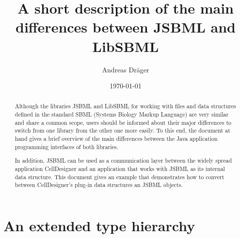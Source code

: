 \documentclass[
  letterpaper,
  11pt,
  headsepline,
  pointlessnumbers,
  tablecaptionabove,
  headinclude,
  appendixprefix,
  idxtotoc,
  bibtotoc,
  titlepage
]{scrartcl}
\title{A short description of the main differences between JSBML and LibSBML}
\author{Andreas Dr\"ager}
\date{\today}
\begin{document}
\maketitle
\tableofcontents

\begin{abstract}
Although the libraries JSBML and LibSBML for working with files and data structures 
defined in the standard SBML (Systems Biology Markup Language) are very similar and 
share a common scope, users should be informed about their major differences to 
switch from one library from the other one more easily. To this end, the document at
hand gives a brief overview of the main differences between the Java\texttrademark{} 
application programming interfaces of both libraries.

In addition, JSBML can be used as a communication layer between the widely spread
application CellDesigner and an application that works with JSBML as its internal
data structure. This document gives an example that demonstrates how to convert
between CellDesigner's plug-in data structures an JSBML objects.
\end{abstract}

\section{An extended type hierarchy}
\end{document}
